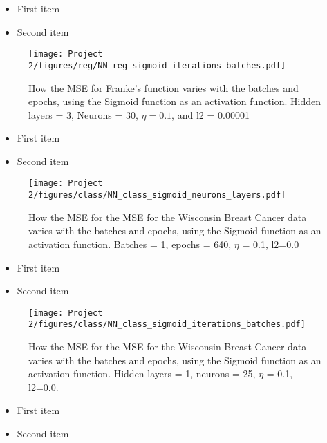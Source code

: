 \documentclass[english,notitlepage,reprint,nofootinbib]{revtex4-2}  %
\begin{document}
\begin{itemize}
\color{white}
\item First item
\item Second item
\end{itemize}

\begin{figure}[h!]
    \centering %
    \texttt{[image: Project 2/figures/reg/NN\_reg\_sigmoid\_iterations\_batches.pdf]} 
    \caption{How the MSE for Franke's function varies with the batches and epochs, using the Sigmoid function as an activation function. 
    Hidden layers = 3, Neurons = 30, $\eta=0.1$, and l2 = 0.00001}
    \label{fig: b_sigmoid_2}
\end{figure}


\begin{itemize}
\color{white}
\item First item
\item Second item
\end{itemize}


\begin{figure}[h!]
    \centering %
    \texttt{[image: Project 2/figures/class/NN\_class\_sigmoid\_neurons\_layers.pdf]} 
    \caption{How the MSE for the MSE for the Wisconsin Breast Cancer data varies with the batches and epochs, using the Sigmoid function as an activation function. Batches = 1, epochs = 640, $\eta$ = 0.1, l2=0.0
    }
    \label{fig: nn_neuron_layer}
\end{figure}


\begin{itemize}
\color{white}
\item First item
\item Second item
\end{itemize}

\begin{figure}[h!]
    \centering %
    \texttt{[image: Project 2/figures/class/NN\_class\_sigmoid\_iterations\_batches.pdf]} 
    \caption{How the MSE for the MSE for the Wisconsin Breast Cancer data varies with the batches and epochs, using the Sigmoid function as an activation function. Hidden layers = 1, neurons = 25, $\eta$ = 0.1, l2=0.0. 
    }
    \label{fig: nn_iter_batch}
\end{figure}


\begin{itemize}
\color{white}
\item First item
\item Second item
\end{itemize}
\end{document}
